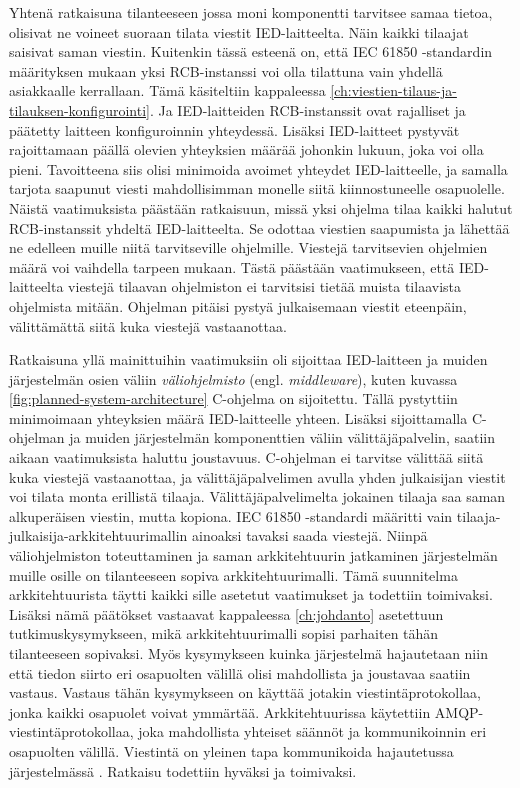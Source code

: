 Yhtenä ratkaisuna tilanteeseen jossa moni komponentti tarvitsee samaa tietoa, olisivat ne voineet suoraan tilata viestit IED-laitteelta. Näin kaikki tilaajat saisivat saman viestin. Kuitenkin tässä esteenä on, että IEC 61850 -standardin määrityksen mukaan yksi RCB-instanssi voi olla tilattuna vain yhdellä asiakkaalle kerrallaan. Tämä käsiteltiin kappaleessa \ref{ch:viestien-tilaus-ja-tilauksen-konfigurointi}. Ja IED-laitteiden RCB-instanssit ovat rajalliset ja päätetty laitteen konfiguroinnin yhteydessä. Lisäksi IED-laitteet pystyvät rajoittamaan päällä olevien yhteyksien määrää johonkin lukuun, joka voi olla pieni. Tavoitteena siis olisi minimoida avoimet yhteydet IED-laitteelle, ja samalla tarjota saapunut viesti mahdollisimman monelle siitä kiinnostuneelle osapuolelle. Näistä vaatimuksista päästään ratkaisuun, missä yksi ohjelma tilaa kaikki halutut RCB-instanssit yhdeltä IED-laitteelta. Se odottaa viestien saapumista ja lähettää ne edelleen muille niitä tarvitseville ohjelmille. Viestejä tarvitsevien ohjelmien määrä voi vaihdella tarpeen mukaan. Tästä päästään vaatimukseen, että IED-laitteelta viestejä tilaavan ohjelmiston ei tarvitsisi tietää muista tilaavista ohjelmista mitään. Ohjelman pitäisi pystyä julkaisemaan viestit eteenpäin, välittämättä siitä kuka viestejä vastaanottaa.

Ratkaisuna yllä mainittuihin vaatimuksiin oli sijoittaa IED-laitteen ja muiden järjestelmän osien väliin \emph{väliohjelmisto} (engl. \emph{middleware}), kuten kuvassa \ref{fig:planned-system-architecture} C-ohjelma on sijoitettu. Tällä pystyttiin minimoimaan yhteyksien määrä IED-laitteelle yhteen. Lisäksi sijoittamalla C-ohjelman ja muiden järjestelmän komponenttien väliin välittäjäpalvelin, saatiin aikaan vaatimuksista haluttu joustavuus. C-ohjelman ei tarvitse välittää siitä kuka viestejä vastaanottaa, ja välittäjäpalvelimen avulla yhden julkaisijan viestit voi tilata monta erillistä tilaaja. Välittäjäpalvelimelta jokainen tilaaja saa saman alkuperäisen viestin, mutta kopiona. IEC 61850 -standardi määritti vain tilaaja-julkaisija-arkkitehtuurimallin ainoaksi tavaksi saada viestejä. Niinpä väliohjelmiston toteuttaminen ja saman arkkitehtuurin jatkaminen järjestelmän muille osille on tilanteeseen sopiva arkkitehtuurimalli. Tämä suunnitelma arkkitehtuurista täytti kaikki sille asetetut vaatimukset ja todettiin toimivaksi. Lisäksi nämä päätökset vastaavat kappaleessa \ref{ch:johdanto} asetettuun tutkimuskysymykseen, mikä arkkitehtuurimalli sopisi parhaiten tähän tilanteeseen sopivaksi. Myös kysymykseen kuinka järjestelmä hajautetaan niin että tiedon siirto eri osapuolten välillä olisi mahdollista ja joustavaa saatiin vastaus. Vastaus tähän kysymykseen on käyttää jotakin viestintäprotokollaa, jonka kaikki osapuolet voivat ymmärtää. Arkkitehtuurissa käytettiin AMQP-viestintäprotokollaa, joka mahdollista yhteiset säännöt ja kommunikoinnin eri osapuolten välillä. Viestintä on yleinen tapa kommunikoida hajautetussa järjestelmässä \mbox{\cite[s.~2]{distributed-systems-concepts-and-design}}. Ratkaisu todettiin hyväksi ja toimivaksi.

